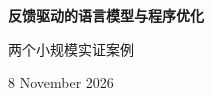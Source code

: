 \documentclass[11pt,a4paper]{article}
\begin{document}
\begin{center}
{\LARGE\bfseries\sffamily\color{inkblue} 反馈驱动的语言模型与程序优化\par}
\vspace{3mm}
{\large 两个小规模实证案例\par}
\vspace{2mm}
{\small 8 November 2026}
\end{center}




\renewcommand{\refname}{参考文献}

\clearpage
\appendix

\end{document}
